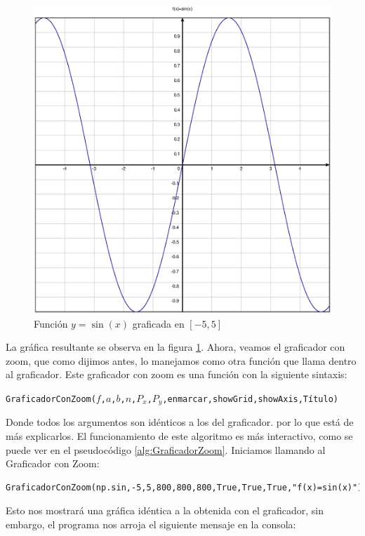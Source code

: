 \documentclass[10pt]{article}
\begin{document}
\begin{figure}[htbp]
    \includegraphics[scale=0.3]{figures/Seno.eps}
    \centering
    \caption{Función $y=\sin (x)$ graficada en $[-5,5]$}
    \label{im:Seno}
\end{figure}
\noindent La gráfica resultante se observa en la figura \ref{im:Seno}. Ahora, veamos el graficador con zoom, que como dijimos antes, lo manejamos como otra función que llama dentro al graficador. Este graficador con zoom es una función con la siguiente sintaxis:
\begin{center}
\texttt{GraficadorConZoom($f$,$a$,$b$,$n$,$P_x$,$P_y$,enmarcar,showGrid,showAxis,Título)}
\end{center}
Donde todos los argumentos son idénticos a los del graficador. por lo que está de más explicarlos. El funcionamiento de este algoritmo es más interactivo, como se puede ver en el pseudocódigo \ref{alg:GraficadorZoom}.
\newpage
\noindent Iniciamos llamando al Graficador con Zoom:

\begin{verbatim}
GraficadorConZoom(np.sin,-5,5,800,800,800,True,True,True,"f(x)=sin(x)")
\end{verbatim}

\noindent Esto nos mostrará una gráfica idéntica a la obtenida con el graficador, sin embargo, el programa nos arroja el siguiente mensaje en la consola:
\end{document}
